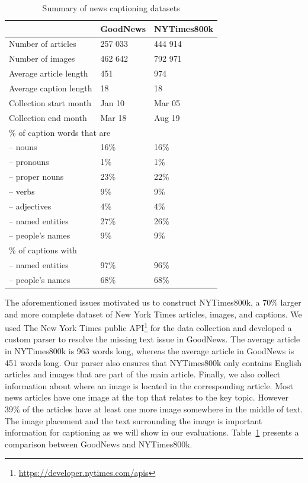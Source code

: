 \begin{table}[t]
	\caption {Summary of news captioning datasets}
	\label{tab:datasets}
	\centering
	\begin{tabularx}{\linewidth}{lXX}
		\toprule
		  & GoodNews  &   NYTimes800k \\
		\midrule
      Number of articles & 257 033 & 444 914 \\
      Number of images   & 462 642 & 792 971 \\
      Average article length & 451 & 974 \\
      Average caption length & 18 & 18 \\
      Collection start month & Jan 10 & Mar 05\\
      Collection end month & Mar 18 & Aug 19 \\
      \midrule
      \multicolumn{2}{l}{\% of caption words that are}  \\
      \quad -- nouns & 16\% & 16\% \\
      \quad -- pronouns & 1\% & 1\% \\
      \quad -- proper nouns & 23\% & 22\% \\
      \quad -- verbs & 9\% & 9\%  \\
      \quad -- adjectives & 4\% & 4\% \\
      \quad -- named entities & 27\% & 26\% \\
      \quad\quad -- people's names & 9\% & 9\% \\
      \midrule
      \% of captions with \\
      \quad -- named entities & 97\% & 96\% \\
      \quad\quad -- people's names & 68\% & 68\% \\
		\bottomrule
	\end{tabularx}
\end{table}


The aforementioned issues motivated us to construct NYTimes800k, a 70\% larger
and more complete dataset of New York Times articles, images, and captions. We
used The New York Times public
API\footnote{\href{https://developer.nytimes.com/apis}{https://developer.nytimes.com/apis}}
for the data collection and developed a custom parser to resolve the missing
text issue in GoodNews. The average article in NYTimes800k is 963 words long,
whereas the average article in GoodNews is 451 words long. Our parser also
ensures that NYTimes800k only contains English articles and images that are
part of the main article. Finally, we also collect information about where an
image is located in the corresponding article. Most news articles have one
image at the top that relates to the key topic. However 39\% of the articles
have at least one more image somewhere in the middle of text. The image
placement and the text surrounding the image is important information for
captioning as we will show in our evaluations. Table~\ref{tab:datasets}
presents a comparison between GoodNews and NYTimes800k.

